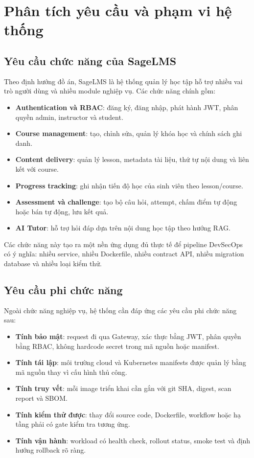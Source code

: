 \chapter{Phân tích yêu cầu và phạm vi hệ thống}
\label{chap:requirements}

\section{Yêu cầu chức năng của SageLMS}

Theo định hướng đồ án, SageLMS là hệ thống quản lý học tập hỗ trợ nhiều vai trò người dùng và nhiều module nghiệp vụ. Các chức năng chính gồm:

\begin{itemize}
  \item \textbf{Authentication và RBAC}: đăng ký, đăng nhập, phát hành JWT, phân quyền admin, instructor và student.
  \item \textbf{Course management}: tạo, chỉnh sửa, quản lý khóa học và chính sách ghi danh.
  \item \textbf{Content delivery}: quản lý lesson, metadata tài liệu, thứ tự nội dung và liên kết với course.
  \item \textbf{Progress tracking}: ghi nhận tiến độ học của sinh viên theo lesson/course.
  \item \textbf{Assessment và challenge}: tạo bộ câu hỏi, attempt, chấm điểm tự động hoặc bán tự động, lưu kết quả.
  \item \textbf{AI Tutor}: hỗ trợ hỏi đáp dựa trên nội dung học tập theo hướng RAG.
\end{itemize}

Các chức năng này tạo ra một nền ứng dụng đủ thực tế để pipeline DevSecOps có ý nghĩa: nhiều service, nhiều Dockerfile, nhiều contract API, nhiều migration database và nhiều loại kiểm thử.

\section{Yêu cầu phi chức năng}

Ngoài chức năng nghiệp vụ, hệ thống cần đáp ứng các yêu cầu phi chức năng sau:

\begin{itemize}
  \item \textbf{Tính bảo mật}: request đi qua Gateway, xác thực bằng JWT, phân quyền bằng RBAC, không hardcode secret trong mã nguồn hoặc manifest.
  \item \textbf{Tính tái lập}: môi trường cloud và Kubernetes manifests được quản lý bằng mã nguồn thay vì cấu hình thủ công.
  \item \textbf{Tính truy vết}: mỗi image triển khai cần gắn với git SHA, digest, scan report và SBOM.
  \item \textbf{Tính kiểm thử được}: thay đổi source code, Dockerfile, workflow hoặc hạ tầng phải có gate kiểm tra tương ứng.
  \item \textbf{Tính vận hành}: workload có health check, rollout status, smoke test và định hướng rollback rõ ràng.
\end{itemize}

